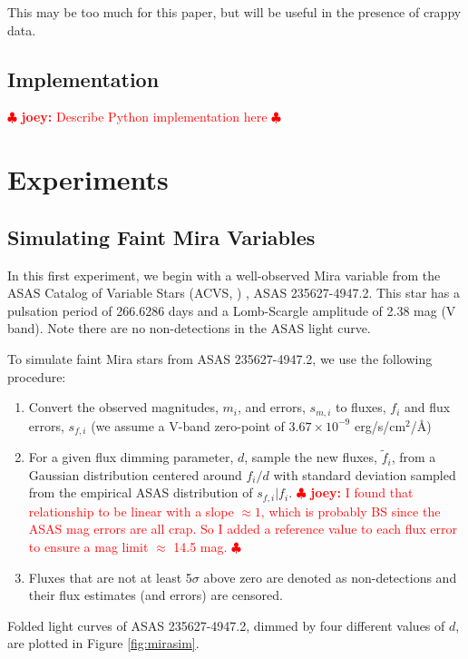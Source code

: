\documentclass[12pt,preprint]{aastex}
\newcommand{\joey}[1] { \textcolor{red} {
\ensuremath{\clubsuit} {\bf joey:}  {#1}
\ensuremath{\clubsuit} } }%
\begin{document}
This may be too much for this paper, but will be useful in the presence of crappy data.



\subsection{Implementation}
\label{ss:implemenation}



\joey{Describe Python implementation here}




\section{Experiments}
\label{sec:experiments}


\subsection{Simulating Faint Mira Variables}
\label{ss:mirasim}

In this first experiment, we begin with a well-observed Mira variable from the ASAS Catalog of Variable Stars (ACVS, \citealt{acvs}) , ASAS 235627-4947.2.  This star has a pulsation period of 266.6286 days and a Lomb-Scargle amplitude of 2.38 mag (V band).  Note there are no non-detections in the ASAS light curve.

To simulate faint Mira stars from ASAS 235627-4947.2, we use the following procedure:
\begin{enumerate}
\item Convert the observed magnitudes, $m_i$, and errors, $s_{m,i}$ to fluxes, $f_i$ and flux errors, $s_{f,i}$ (we assume a V-band zero-point of $3.67\times10^{-9}$ erg/s/cm$^2$/\AA)
\item For a given flux dimming parameter, $d$, sample the new fluxes, $\tilde{f}_i$, from a Gaussian distribution centered around $f_i / d$ with standard deviation sampled from the empirical ASAS distribution of $s_{f,i} | f_i$. \joey{I found that relationship to be linear with a slope $\approx 1$, which is probably BS since the ASAS mag errors are all crap.  So I added a reference value to each flux error to ensure a mag limit $\approx$ 14.5 mag.}
\item Fluxes that are not at least 5$\sigma$ above zero are denoted as non-detections and their flux estimates (and errors) are censored.
\end{enumerate}
Folded light curves of ASAS 235627-4947.2, dimmed by four different values of $d$, are plotted in Figure \ref{fig:mirasim}.
\end{document}
